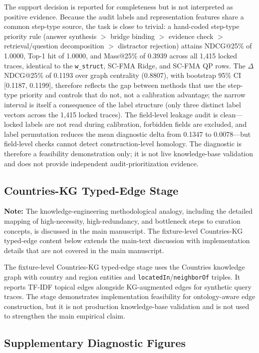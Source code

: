 \documentclass[a4paper,fleqn]{cas-sc}
\begin{document}
The support decision is reported for completeness but is not interpreted as positive evidence. Because the audit labels and representation features share a common step-type source, the task is close to trivial: a hand-coded step-type priority rule (answer synthesis $>$ bridge binding $>$ evidence check $>$ retrieval/question decomposition $>$ distractor rejection) attains NDCG@25\% of 1.0000, Top-1 hit of 1.0000, and Mass@25\% of 0.3939 across all 1,415 locked traces, identical to the \texttt{w\_struct}, SC-FMA Ridge, and SC-FMA QP rows. The $\Delta$NDCG@25\% of 0.1193 over graph centrality (0.8807), with bootstrap 95\% CI [0.1187, 0.1199], therefore reflects the gap between methods that use the step-type priority and controls that do not, not a calibration advantage; the narrow interval is itself a consequence of the label structure (only three distinct label vectors across the 1,415 locked traces). The field-level leakage audit is clean---locked labels are not read during calibration, forbidden fields are excluded, and label permutation reduces the mean diagnostic delta from 0.1347 to 0.0078---but field-level checks cannot detect construction-level homology. The diagnostic is therefore a feasibility demonstration only; it is not live knowledge-base validation and does not provide independent audit-prioritization evidence.

\subsection{Countries-KG Typed-Edge Stage}
\label{app:kg-representation-stage}

\noindent\textbf{Note:} The knowledge-engineering methodological analogy, including the detailed mapping of high-necessity, high-redundancy, and bottleneck steps to curation concepts, is discussed in the main manuscript. The fixture-level Countries-KG typed-edge content below extends the main-text discussion with implementation details that are not covered in the main manuscript.

The fixture-level Countries-KG typed-edge stage uses the Countries knowledge graph with country and region entities and \texttt{locatedIn}/\texttt{neighborOf} triples. It reports TF-IDF topical edges alongside KG-augmented edges for synthetic query traces. The stage demonstrates implementation feasibility for ontology-aware edge construction, but it is not production knowledge-base validation and is not used to strengthen the main empirical claim.

\subsection{Supplementary Diagnostic Figures}
\label{app:supp-figures}
\end{document}
